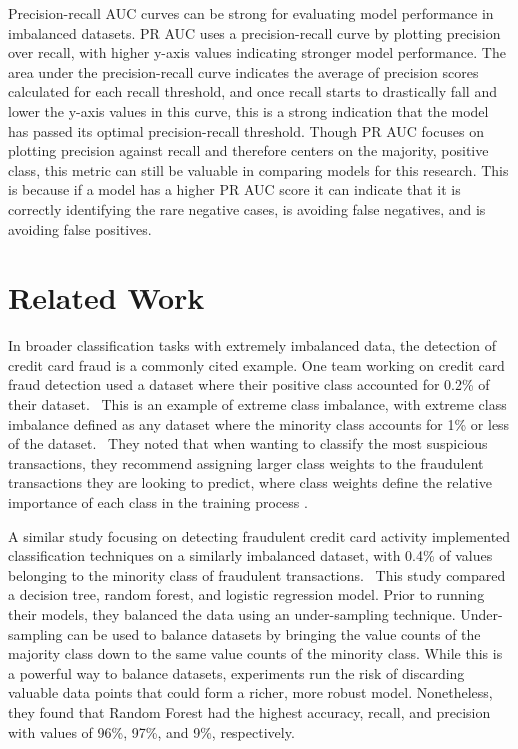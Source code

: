 \documentclass{article}
\begin{document}
Precision-recall AUC curves can be strong for evaluating model performance in imbalanced datasets. PR AUC uses a precision-recall curve by plotting precision over recall, with higher y-axis values indicating stronger model performance. The area under the precision-recall curve indicates the average of precision scores calculated for each recall threshold, and once recall starts to drastically fall and lower the y-axis values in this curve, this is a strong indication that the model has passed its optimal precision-recall threshold. Though PR AUC focuses on plotting precision against recall and therefore centers on the majority, positive class, this metric can still be valuable in comparing models for this research. This is because if a model has a higher PR AUC score it can indicate that it is correctly identifying the rare negative cases, is avoiding false negatives, and is avoiding false positives. 

\section{Related Work}

In broader classification tasks with extremely imbalanced data, the detection of credit card fraud is a commonly cited example. One team working on credit card fraud detection used a dataset where their positive class accounted for 0.2\% of their dataset.~\cite{dalpozz} This is an example of extreme class imbalance, with extreme class imbalance defined as any dataset where the minority class accounts for 1\% or less of the dataset.~\cite{googleML} They noted that when wanting to classify the most suspicious transactions, they recommend assigning larger class weights to the fraudulent transactions they are looking to predict, where class weights define the relative importance of each class in the training process .~\cite {MATLABHelp}

A similar study focusing on detecting fraudulent credit card activity implemented classification techniques on a similarly imbalanced dataset, with 0.4\% of values belonging to the minority class of fraudulent transactions.~\cite{AFRIYIE2023100163}  This study compared a decision tree, random forest, and logistic regression model. Prior to running their models, they balanced the data using an under-sampling technique. Under-sampling can be used to balance datasets by bringing the value counts of the majority class down to the same value counts of the minority class. While this is a powerful way to balance datasets, experiments run the risk of discarding valuable data points that could form a richer, more robust model. Nonetheless, they found that Random Forest had the highest accuracy, recall, and precision with values of 96\%, 97\%, and 9\%, respectively. 
\end{document}

